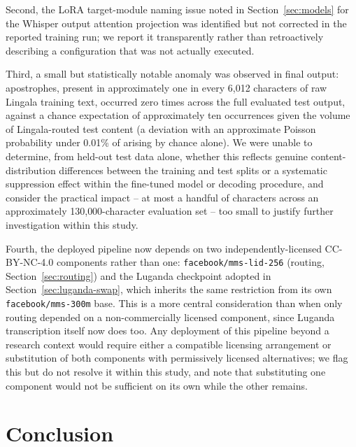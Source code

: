\documentclass[11pt]{article}
\begin{document}
Second, the LoRA target-module naming issue noted in Section~\ref{sec:models} for the Whisper output attention projection was identified but not corrected in the reported training run; we report it transparently rather than retroactively describing a configuration that was not actually executed.

Third, a small but statistically notable anomaly was observed in final output: apostrophes, present in approximately one in every 6{,}012 characters of raw Lingala training text, occurred zero times across the full evaluated test output, against a chance expectation of approximately ten occurrences given the volume of Lingala-routed test content (a deviation with an approximate Poisson probability under 0.01\% of arising by chance alone). We were unable to determine, from held-out test data alone, whether this reflects genuine content-distribution differences between the training and test splits or a systematic suppression effect within the fine-tuned model or decoding procedure, and consider the practical impact -- at most a handful of characters across an approximately 130{,}000-character evaluation set -- too small to justify further investigation within this study.

Fourth, the deployed pipeline now depends on two independently-licensed CC-BY-NC-4.0 components rather than one: \texttt{facebook/mms-lid-256} (routing, Section~\ref{sec:routing}) and the Luganda checkpoint adopted in Section~\ref{sec:luganda-swap}, which inherits the same restriction from its own \texttt{facebook/mms-300m} base. This is a more central consideration than when only routing depended on a non-commercially licensed component, since Luganda transcription itself now does too. Any deployment of this pipeline beyond a research context would require either a compatible licensing arrangement or substitution of both components with permissively licensed alternatives; we flag this but do not resolve it within this study, and note that substituting one component would not be sufficient on its own while the other remains.

\section{Conclusion}
\end{document}
